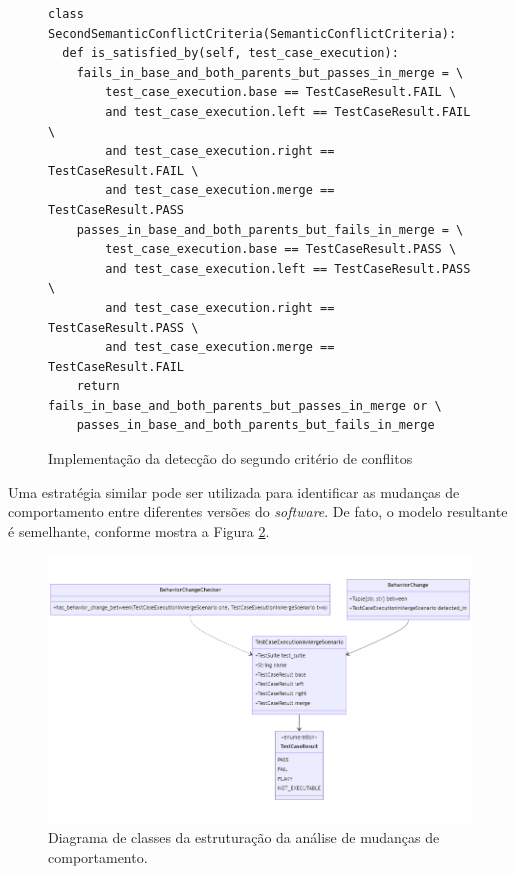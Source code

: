 \documentclass[12pt]{article}
\begin{document}
\begin{figure}[H]
\begin{verbatim}
class SecondSemanticConflictCriteria(SemanticConflictCriteria):
  def is_satisfied_by(self, test_case_execution):
    fails_in_base_and_both_parents_but_passes_in_merge = \
        test_case_execution.base == TestCaseResult.FAIL \
        and test_case_execution.left == TestCaseResult.FAIL \
        and test_case_execution.right == TestCaseResult.FAIL \
        and test_case_execution.merge == TestCaseResult.PASS
    passes_in_base_and_both_parents_but_fails_in_merge = \
        test_case_execution.base == TestCaseResult.PASS \
        and test_case_execution.left == TestCaseResult.PASS \
        and test_case_execution.right == TestCaseResult.PASS \
        and test_case_execution.merge == TestCaseResult.FAIL
    return fails_in_base_and_both_parents_but_passes_in_merge or \
    passes_in_base_and_both_parents_but_fails_in_merge
\end{verbatim}
\caption{Implementação da detecção do segundo critério de conflitos}
\label{fig:criteria-python}
\end{figure}

Uma estratégia similar pode ser utilizada para identificar as mudanças de comportamento entre diferentes versões do \textit{software}. De fato, o modelo resultante é semelhante, conforme mostra a Figura \ref{fig:bc}.

\begin{figure}[H]
    \centering
    \includegraphics[width=\textwidth]{bc.png}
    \caption{Diagrama de classes da estruturação da análise de mudanças de comportamento.}
    \label{fig:bc}
\end{figure}
\end{document}
